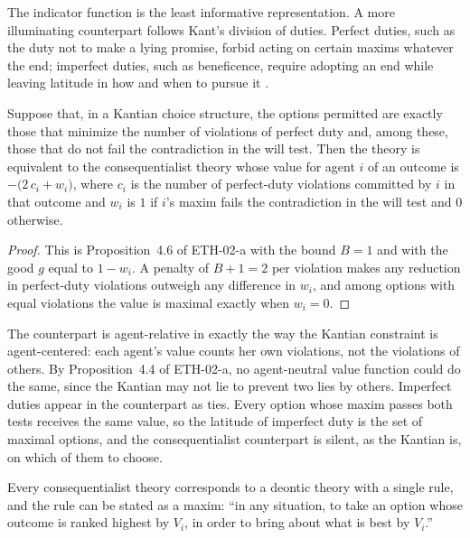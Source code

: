 \documentclass{situationist-preprint}
\begin{document}
The indicator function is the least informative representation. A more illuminating counterpart follows Kant's division of duties. Perfect duties, such as the duty not to make a lying promise, forbid acting on certain maxims whatever the end; imperfect duties, such as beneficence, require adopting an end while leaving latitude in how and when to pursue it \citep{ONeill1975,Herman1993}.

\begin{proposition}\label{p:perfect}
Suppose that, in a Kantian choice structure, the options permitted are exactly those that minimize the number of violations of perfect duty and, among these, those that do not fail the contradiction in the will test. Then the theory is equivalent to the consequentialist theory whose value for agent $i$ of an outcome is $-\bigl(2\,c_i + w_i\bigr)$, where $c_i$ is the number of perfect-duty violations committed by $i$ in that outcome and $w_i$ is $1$ if $i$'s maxim fails the contradiction in the will test and $0$ otherwise.
\end{proposition}

\begin{proof}
This is Proposition~4.6 of ETH-02-a with the bound $B = 1$ and with the good $g$ equal to $1 - w_i$. A penalty of $B + 1 = 2$ per violation makes any reduction in perfect-duty violations outweigh any difference in $w_i$, and among options with equal violations the value is maximal exactly when $w_i = 0$.
\end{proof}

The counterpart is agent-relative in exactly the way the Kantian constraint is agent-centered: each agent's value counts her own violations, not the violations of others. By Proposition~4.4 of ETH-02-a, no agent-neutral value function could do the same, since the Kantian may not lie to prevent two lies by others. Imperfect duties appear in the counterpart as ties. Every option whose maxim passes both tests receives the same value, so the latitude of imperfect duty is the set of maximal options, and the consequentialist counterpart is silent, as the Kantian is, on which of them to choose.

\begin{proposition}\label{p:converse}
Every consequentialist theory corresponds to a deontic theory with a single rule, and the rule can be stated as a maxim: \enquote{in any situation, to take an option whose outcome is ranked highest by $V_i$, in order to bring about what is best by $V_i$.}
\end{proposition}
\end{document}
